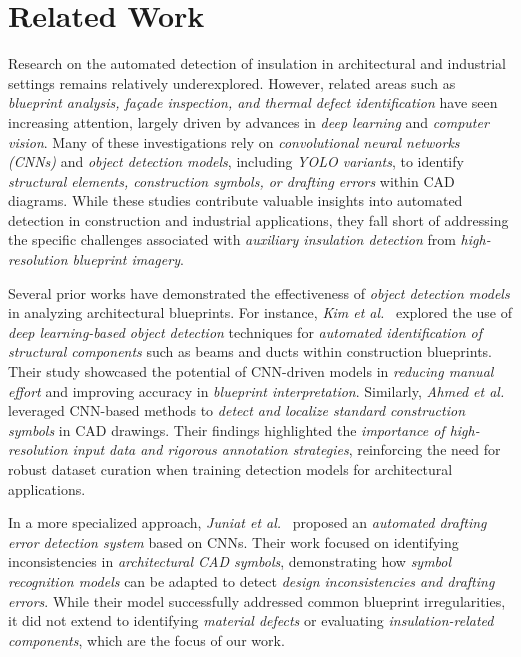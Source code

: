 \section{Related Work}
Research on the automated detection of insulation in architectural and industrial settings remains relatively underexplored. However, related areas such as \textit{blueprint analysis, façade inspection, and thermal defect identification} have seen increasing attention, largely driven by advances in \textit{deep learning} and \textit{computer vision}. Many of these investigations rely on \textit{convolutional neural networks (CNNs)} and \textit{object detection models}, including \textit{YOLO variants}, to identify \textit{structural elements, construction symbols, or drafting errors} within CAD diagrams. While these studies contribute valuable insights into automated detection in construction and industrial applications, they fall short of addressing the specific challenges associated with \textit{auxiliary insulation detection} from \textit{high-resolution blueprint imagery}.  

Several prior works have demonstrated the effectiveness of \textit{object detection models} in analyzing architectural blueprints. For instance, \textit{Kim et al.}~\cite{kim2020automated} explored the use of \textit{deep learning-based object detection} techniques for \textit{automated identification of structural components} such as beams and ducts within construction blueprints. Their study showcased the potential of CNN-driven models in \textit{reducing manual effort} and improving accuracy in \textit{blueprint interpretation}. Similarly, \textit{Ahmed et al.}~\cite{ahmed2020automatic} leveraged CNN-based methods to \textit{detect and localize standard construction symbols} in CAD drawings. Their findings highlighted the \textit{importance of high-resolution input data and rigorous annotation strategies}, reinforcing the need for robust dataset curation when training detection models for architectural applications.  

In a more specialized approach, \textit{Juniat et al.}~\cite{juniat2022automated} proposed an \textit{automated drafting error detection system} based on CNNs. Their work focused on identifying inconsistencies in \textit{architectural CAD symbols}, demonstrating how \textit{symbol recognition models} can be adapted to detect \textit{design inconsistencies and drafting errors}. While their model successfully addressed common blueprint irregularities, it did not extend to identifying \textit{material defects} or evaluating \textit{insulation-related components}, which are the focus of our work.  


